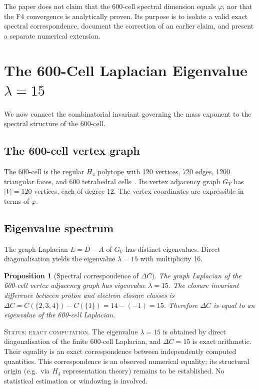 \documentclass[12pt]{article}
\newtheorem{proposition}[theorem]{Proposition}
\newcommand{\phig}{\varphi}
\begin{document}
The paper does not claim that the 600-cell spectral dimension equals $\phig$, nor that the F4 convergence is analytically proven. Its purpose is to isolate a valid exact spectral correspondence, document the correction of an earlier claim, and present a separate numerical extension.

\section{The 600-Cell Laplacian Eigenvalue $\lambda = 15$}\label{sec:eigenvalue}

We now connect the combinatorial invariant governing the mass exponent to the spectral structure of the 600-cell.

\subsection{The 600-cell vertex graph}

The 600-cell is the regular $H_4$ polytope with 120 vertices, 720 edges, 1200 triangular faces, and 600 tetrahedral cells~\citep{Coxeter1973}. Its vertex adjacency graph $G_V$ has $|V| = 120$ vertices, each of degree 12. The vertex coordinates are expressible in terms of $\phig$.

\subsection{Eigenvalue spectrum}

The graph Laplacian $L = D - A$ of $G_V$ has distinct eigenvalues. Direct diagonalisation yields the eigenvalue $\lambda = 15$ with multiplicity 16.

\begin{proposition}[Spectral correspondence of $\Delta C$]\label{prop:eigenvalue}
The graph Laplacian of the 600-cell vertex adjacency graph has eigenvalue $\lambda = 15$. The closure invariant difference between proton and electron closure classes is $\Delta C = C(\{2,3,4\}) - C(\{1\}) = 14 - (-1) = 15$. Therefore $\Delta C$ is equal to an eigenvalue of the 600-cell Laplacian.
\end{proposition}

\textsc{Status: exact computation.} The eigenvalue $\lambda = 15$ is obtained by direct diagonalisation of the finite 600-cell Laplacian, and $\Delta C = 15$ is exact arithmetic. Their equality is an exact correspondence between independently computed quantities. This correspondence is an observed numerical equality; its structural origin (e.g.\ via $H_4$ representation theory) remains to be established. No statistical estimation or windowing is involved.
\end{document}
